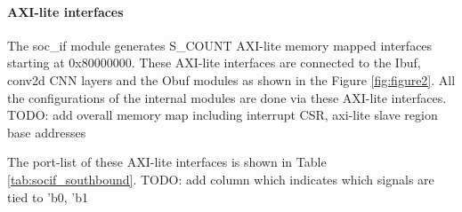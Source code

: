 \paragraph{AXI-lite interfaces} 
The soc\_if module generates S\_COUNT AXI-lite memory mapped interfaces
starting at 0x80000000. These AXI-lite interfaces are connected to the Ibuf,
conv2d CNN layers and the Obuf modules as shown in the Figure \ref{fig:figure2}. All the
configurations of the internal modules are done via these AXI-lite
interfaces.\\
TODO: add overall memory map including interrupt CSR, axi-lite slave region base addresses

The port-list of these AXI-lite interfaces is shown in Table \ref{tab:socif_southbound}.  
TODO: add column which indicates which signals are tied to 'b0, 'b1

